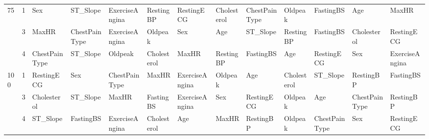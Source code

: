 \begin{table}[htbp]
\begin{tabular}{lllllllllllll}
\multirow[c]{3}{*}{75} & 1 & Sex & ST_Slope & ExerciseAngina & RestingBP & RestingECG & Cholesterol & ChestPainType & Oldpeak & FastingBS & Age & MaxHR \\
 & 3 & MaxHR & ChestPainType & ExerciseAngina & Oldpeak & Sex & Age & ST_Slope & RestingBP & FastingBS & Cholesterol & RestingECG \\
 & 4 & ChestPainType & ST_Slope & Oldpeak & Cholesterol & MaxHR & RestingBP & FastingBS & Age & RestingECG & Sex & ExerciseAngina \\
\multirow[c]{3}{*}{100} & 1 & RestingECG & Sex & ChestPainType & MaxHR & ExerciseAngina & Oldpeak & Age & Cholesterol & ST_Slope & RestingBP & FastingBS \\
 & 3 & Cholesterol & ST_Slope & MaxHR & FastingBS & ExerciseAngina & Sex & RestingECG & Oldpeak & Age & ChestPainType & RestingBP \\
 & 4 & ST_Slope & FastingBS & ExerciseAngina & Cholesterol & Age & MaxHR & RestingBP & Oldpeak & ChestPainType & Sex & RestingECG \\
\bottomrule
\end{tabular}
\end{table}
